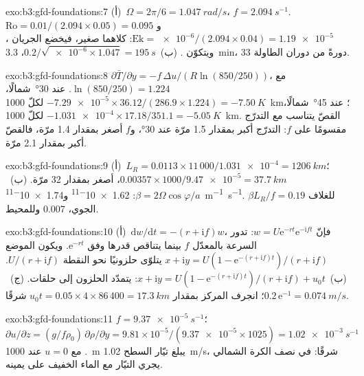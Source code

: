 \begin{solution}{exo:b3:gfd-foundations:7}
(أ)~$\Omega = 2\pi/6 = \qty{1.047}{rad/s}$، $f = \qty{2.094}{s^{-1}}$.
$\mathrm{Ro} = 0.01/(2.094\times0.05) = 0.095$ و$\mathrm{Ek} =
\num{e-6}/(2.094\times0.04) = \num{1.19e-5}$: كلاهما صغير، فيخضع الجريان
، ويتكوّن . (ب)~$0.2/\sqrt{\num{e-6}
\times1.047} = \qty{195}{s}$، \qty{3.3}{min}، 33 دورةً من دوران الطاولة.
\end{solution}

\begin{solution}{exo:b3:gfd-foundations:8}
$\partial\bar T/\partial y = -f\,\Delta u/(R\ln(850/250))$، مع
$\ln(850/250) = 1.224$. عند \ang{30}~شمالًا، $-\num{7.29e-5}\times36.12/(286.9
\times1.224) = \qty{-7.50}{K}$ لكلّ \qty{1000}{km}؛ عند \ang{45}~شمالًا،
$-\num{1.031e-4}\times17.18/351.1 = \qty{-5.05}{K}$ لكلّ \qty{1000}{km}. القصّ
يتناسب مع التدرّج مقسومًا على $f$: التدرّج أكبر بمقدار 1.5
مرّة عند \ang{30}، و$f$ أصغر بمقدار 1.4 مرّة، فالقصّ أكبر بمقدار 2.1
مرّة.
\end{solution}

\begin{solution}{exo:b3:gfd-foundations:9}
(أ)~$L_R = 0.0113\times11\,000/\num{1.031e-4} = \qty{1206}{km}$؛
$0.00357\times1000/\num{9.47e-5} = \qty{37.7}{km}$، أصغر بمقدار 32 مرّة.
(ب)~$\beta = 2\Omega\cos\varphi/a$: \num{1.62e-11}
و\qty{1.74e-11}{m^{-1}.s^{-1}}. $\beta L_R/f = 0.19$ للغلاف الجوي، 0.007
وللمحيط.
\end{solution}

\begin{solution}{exo:b3:gfd-foundations:10}
(أ)~$\mathrm dw/\mathrm dt = -(r + \mathrm if)w$، فإنّ $w = U\mathrm
e^{-rt}\mathrm e^{-\mathrm ift}$: تدور السرعة بالمعدّل $f$ بينما
يتناقص قدرها وفق $\mathrm e^{-rt}$. ويكون الموضع $x + \mathrm iy =
U(1 - \mathrm e^{-(r + \mathrm if)t})/(r + \mathrm if)$ يتلوّى حلزونيًا نحو
النقطة $U/(r + \mathrm if)$. (ب)~$x + \mathrm iy = U(1 - \mathrm e^{-(r +
\mathrm if)t})/(r + \mathrm if) + u_0t$: يتمدّد الحلزون إلى حلقات.
(ج)~$0.2\,\mathrm e^{-1} = \qty{0.074}{m/s}$؛ انجرف المركز بمقدار $u_0t =
0.05\times4\times86\,400 = \qty{17.3}{km}$ شرقًا.
\end{solution}

\begin{solution}{exo:b3:gfd-foundations:11}
$f = \qty{9.37e-5}{s^{-1}}$؛ $\partial u/\partial z = (g/f\rho_0)\,\partial
\rho/\partial y = 9.81\times10^{-5}/(\num{9.37e-5}\times1025) =
\qty{1.02e-3}{s^{-1}}$. مع $u = 0$ عند \qty{1000}{m} يبلغ تيّار السطح
\qty{1.02}{m/s}، شرقًا: في نصف الكرة الشمالي يجري التيّار
مع الماء الخفيف على يمينه.
\end{solution}

